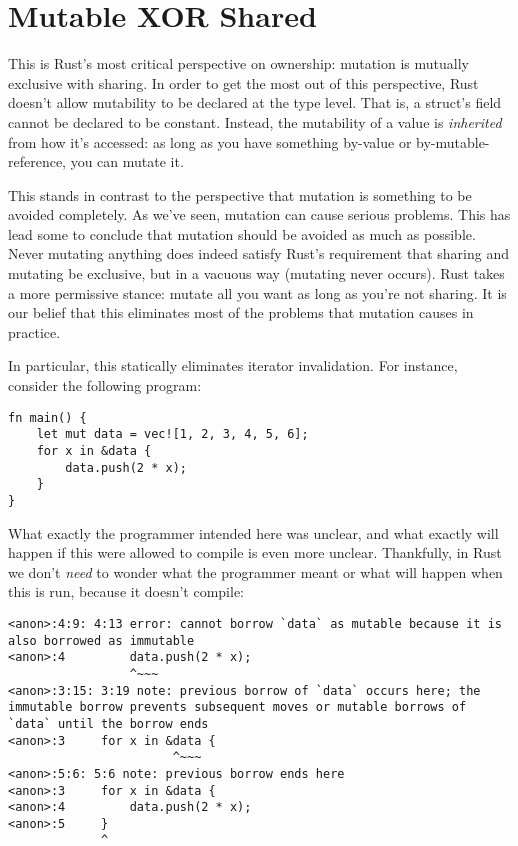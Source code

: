 \section{Mutable XOR Shared}

This is Rust's most critical perspective on ownership: mutation is mutually
exclusive with sharing. In order to get the most out of this perspective, Rust
doesn't allow mutability to be declared at the type level. That is, a struct's
field cannot be declared to be constant. Instead, the mutability of a value is
\emph{inherited} from how it's accessed: as long as you have something by-value or
by-mutable-reference, you can mutate it.

This stands in contrast to the perspective that mutation is something to be
avoided completely. As we've seen, mutation can cause serious problems. This
has lead some to conclude that mutation should be avoided as much
as possible. Never mutating anything does indeed satisfy Rust's requirement
that sharing and mutating be exclusive, but in a vacuous way (mutating never
occurs). Rust takes a more permissive stance: mutate all you want as long
as you're not sharing. It is our belief that this eliminates most of the
problems that mutation causes in practice.

In particular, this statically eliminates iterator invalidation. For
instance, consider the following program:

\begin{verbatim}
fn main() {
    let mut data = vec![1, 2, 3, 4, 5, 6];
    for x in &data {
        data.push(2 * x);
    }
}
\end{verbatim}

What exactly the programmer intended here was unclear, and what exactly
will happen if this were allowed to compile is even more unclear.
Thankfully, in Rust we don't \emph{need} to wonder what the programmer meant or
what will happen when this is run, because it doesn't compile:

\begin{verbatim}
<anon>:4:9: 4:13 error: cannot borrow `data` as mutable because it is also borrowed as immutable
<anon>:4         data.push(2 * x);
                 ^~~~
<anon>:3:15: 3:19 note: previous borrow of `data` occurs here; the immutable borrow prevents subsequent moves or mutable borrows of `data` until the borrow ends
<anon>:3     for x in &data {
                       ^~~~
<anon>:5:6: 5:6 note: previous borrow ends here
<anon>:3     for x in &data {
<anon>:4         data.push(2 * x);
<anon>:5     }
             ^
\end{verbatim}


